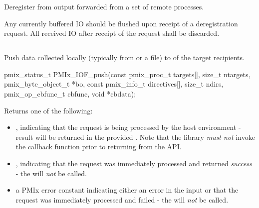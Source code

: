 \descr

Deregister from output forwarded from a set of remote processes.

\adviceimplstart
Any currently buffered \ac{IO} should be flushed upon receipt of a deregistration request. All received \ac{IO} after receipt of the request shall be discarded.
\adviceimplend


\subsection{}

\summary

Push data collected locally (typically from  or a file) to  of the target recipients.

\format

\cspecificstart
\begin{codepar}
pmix_status_t
PMIx_IOF_push(const pmix_proc_t targets[], size_t ntargets,
              pmix_byte_object_t *bo,
              const pmix_info_t directives[], size_t ndirs,
              pmix_op_cbfunc_t cbfunc, void *cbdata);
\end{codepar}
\cspecificend

\begin{arglist}
\end{arglist}

Returns one of the following:

\begin{itemize}
    \item {}, indicating that the request is being processed by the host environment - result will be returned in the provided . Note that the library \emph{must not} invoke the callback function prior to returning from the \ac{API}.
    \item {}, indicating that the request was immediately processed and returned \textit{success} - the  will \textit{not} be called.
    \item a PMIx error constant indicating either an error in the input or that the request was immediately processed and failed - the  will \textit{not} be called.
\end{itemize}

